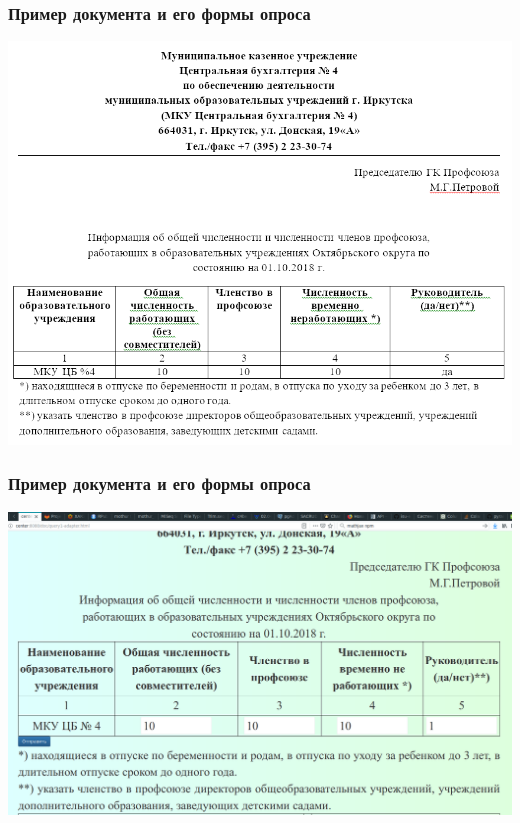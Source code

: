 \documentclass[10pt]{beamer}
\begin{document}
\begin{frame}
  \frametitle{Пример \textbf{документа} и его формы опроса}
  \centering
  \includegraphics[width=1\linewidth]{pics/quest-source.png}
\end{frame}

\begin{frame}
  \frametitle{Пример документа и его \textbf{формы опроса}}
  \centering
  \includegraphics[width=1\linewidth]{pics/quest-form.png}
\end{frame}
\end{document}
